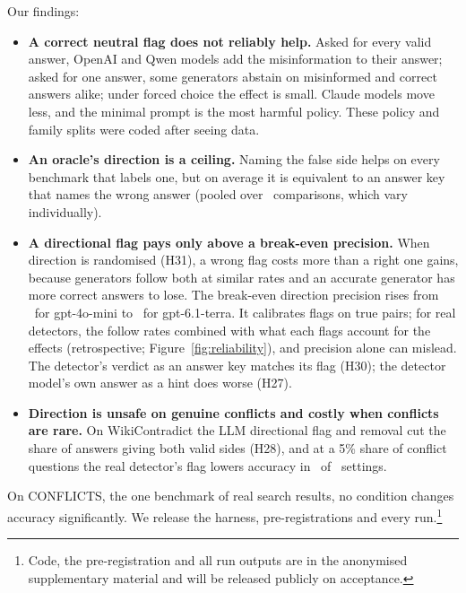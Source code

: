 Our findings:
\begin{itemize}[leftmargin=*,itemsep=1pt,topsep=2pt]
\item \textbf{A correct neutral flag does not reliably help.} Asked for every valid answer, OpenAI and Qwen models add the
misinformation to their answer; asked for one answer, some generators abstain on misinformed and correct answers
alike; under forced choice the effect is small. Claude models move less, and the minimal prompt is the most harmful
policy. These policy and family splits were coded after seeing data.
\item \textbf{An oracle's direction is a ceiling.} Naming the false side helps on every benchmark that labels one, but
on average it is equivalent to an answer key that names the wrong answer (pooled over \PoolTwentyThreeK\
comparisons, which vary individually).
\item \textbf{A directional flag pays only above a break-even precision.} When direction is randomised (H31), a wrong
flag costs more than a right one gains, because generators follow both at similar rates and an accurate generator has
more correct answers to lose. The break-even direction precision rises from \beMin\ for gpt-4o-mini to \beMax\ for
gpt-6.1-terra. It calibrates flags on true pairs; for real detectors, the follow rates combined with what each
flags account for the effects (retrospective; Figure~\ref{fig:reliability}), and precision alone can mislead. The detector's verdict as an answer key matches its flag (H30); the detector model's
own answer as a hint does worse (H27).
\item \textbf{Direction is unsafe on genuine conflicts and costly when conflicts are rare.} On WikiContradict the LLM
directional flag and removal cut the share of answers giving both valid sides (H28), and at a 5\% share of conflict
questions the real detector's flag lowers accuracy in \prevNegFive\ of \prevN\ settings.
\end{itemize}
On CONFLICTS, the one benchmark of real search results, no condition changes accuracy significantly. We release the harness, pre-registrations and every run.\footnote{Code, the pre-registration and
all run outputs are in the anonymised supplementary material and will be released publicly on acceptance.}
